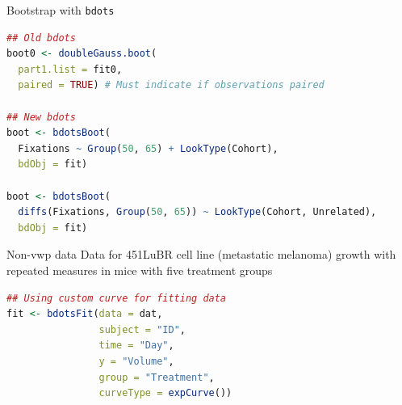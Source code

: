 \documentclass{beamer}
\begin{document}
\begin{frame}[fragile]{Bootstrap with \texttt{bdots}}
\lstset{basicstyle=\footnotesize\ttfamily, style = rstyle}
\begin{lstlisting}[language=R, showstringspaces=false]
## Old bdots
boot0 <- doubleGauss.boot(
  part1.list = fit0, 
  paired = TRUE) # Must indicate if observations paired
  
## New bdots
boot <- bdotsBoot(
  Fixations ~ Group(50, 65) + LookType(Cohort), 
  bdObj = fit)
  
boot <- bdotsBoot(
  diffs(Fixations, Group(50, 65)) ~ LookType(Cohort, Unrelated), 
  bdObj = fit)
\end{lstlisting}
\end{frame}

\begin{frame}[fragile]{Non-vwp data}
Data for 451LuBR cell line (metastatic melanoma) growth with repeated measures in mice with five treatment groups \newline \\

\lstset{basicstyle=\footnotesize\ttfamily, style = rstyle}
\begin{lstlisting}[language=R, showstringspaces=false]
## Using custom curve for fitting data
fit <- bdotsFit(data = dat, 
                subject = "ID", 
                time = "Day", 
                y = "Volume", 
                group = "Treatment", 
                curveType = expCurve())
\end{lstlisting}
\end{frame}
\end{document}
